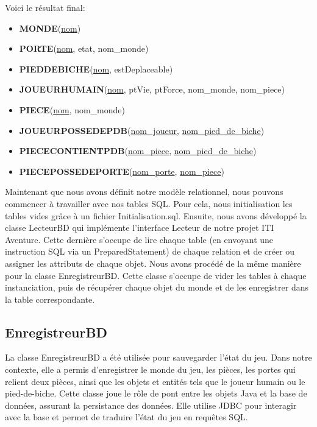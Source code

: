 \documentclass[a4paper, 12pt]{report}
\begin{document}
\vspace{1cm}
Voici le résultat final:
\begin{itemize}
    \item \textbf{MONDE}(\underline{nom})
    \item \textbf{PORTE}(\underline{nom}, etat, nom\_monde)
    \item \textbf{PIEDDEBICHE}(\underline{nom}, estDeplaceable)
    \item \textbf{JOUEURHUMAIN}(\underline{nom}, ptVie, ptForce, nom\_monde, nom\_piece)
    \item \textbf{PIECE}(\underline{nom}, nom\_monde)
    \item \textbf{JOUEURPOSSEDEPDB}(\underline{nom\_joueur}, \underline{nom\_pied\_de\_biche})
    \item \textbf{PIECECONTIENTPDB}(\underline{nom\_piece}, \underline{nom\_pied\_de\_biche})
    \item \textbf{PIECEPOSSEDEPORTE}(\underline{nom\_porte}, \underline{nom\_piece})\\
\end{itemize}


Maintenant que nous avons définit notre modèle relationnel, nous pouvons commencer à travailler avec nos tables SQL. 
Pour cela, nous initialisation les tables vides grâce à un fichier Initialisation.sql. Ensuite, nous avons développé la classe LecteurBD qui implémente l'interface 
Lecteur de notre projet ITI Aventure. Cette dernière s'occupe de lire chaque table (en envoyant une instruction SQL via un PreparedStatement) de chaque relation et de créer 
ou assigner les attributs de chaque objet. Nous avons procédé de la même manière pour la classe EnregistreurBD.
Cette classe s'occupe de vider les tables à chaque instanciation, puis de récupérer chaque objet du monde et de les enregistrer dans la table correspondante. 

\subsection{EnregistreurBD}
La classe EnregistreurBD a été utilisée pour sauvegarder l’état du jeu. Dans notre contexte, elle a permis d’enregistrer le monde du jeu, les pièces, 
les portes qui relient deux pièces, ainsi que les objets et entités tels que le joueur humain ou le pied-de-biche. Cette classe joue le rôle de pont entre 
les objets Java et la base de données, assurant la persistance des données. Elle utilise JDBC pour interagir avec la base et permet de traduire l’état du jeu en requêtes SQL.
\end{document}
